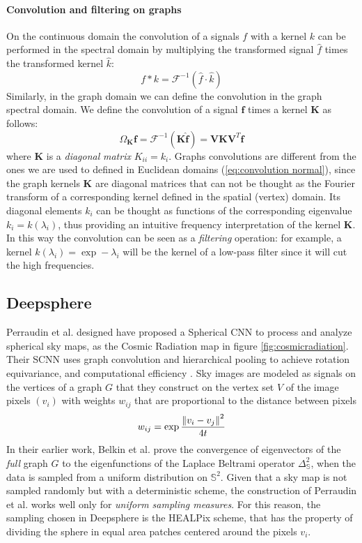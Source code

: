 \paragraph{Convolution and filtering on graphs}
On the continuous domain the convolution of a signals $f$ with a kernel $k$ can be performed in the spectral domain by multiplying the transformed signal $\hat f$ times the transformed kernel $\hat k$: 
\begin{equation}\label{eq:convolution normal}
	f*k = \mathcal F^{-1}(\hat f \cdot \hat k)
\end{equation}
Similarly, in the graph domain we can define the convolution in the graph spectral domain. We define the convolution of a signal $\mathbf f$ times a kernel $\mathbf K$ as follows:
\begin{equation}\label{eq:graph convolution}
	\Omega_\mathbf K\mathbf f = \mathcal{F}^{-1}(\mathbf K \hat {\mathbf f})= \mathbf V\mathbf K  \mathbf V^T {\mathbf f}
\end{equation}
where $\mathbf K$ is a \textit{diagonal} \textit{matrix} $K_{ii} = k_i$. Graphs convolutions are different from the ones we are used to defined in Euclidean domains (\ref{eq:convolution normal}), since the graph kernels $\mathbf K$ are diagonal matrices that can not be thought as the Fourier transform of a corresponding kernel defined in the spatial (vertex) domain. Its diagonal elements $k_{i}$ can be thought as functions of the corresponding eigenvalue $k_{i}= k(\lambda_i)$, thus providing an intuitive frequency interpretation of the kernel $\mathbf K$. In this way the convolution can be seen as a \textit{filtering} operation: for example, a kernel $k(\lambda_i) = \exp -\lambda_i$ will be the kernel of a low-pass filter since it will cut the high frequencies.

\subsection{Deepsphere}\label{sec:Chapter1:DeepSphere}
Perraudin et al. designed have proposed a Spherical CNN to process and analyze spherical sky maps, as the Cosmic Radiation map in figure \ref{fig:cosmicradiation}. Their SCNN uses graph convolution and hierarchical pooling to achieve rotation equivariance, and computational efficiency \cite{DeepSphere}. Sky images are modeled as signals on the vertices of a graph $G$ that they construct on the vertex set $V$ of the image pixels $(v_i)$ with weights $w_{ij}$ that are proportional to the distance between pixels 
$$
w_{ij}=\exp \frac{\left\lVert v_i-v_j\right\rVert^2}{4t}
$$
In their earlier work, Belkin et al. \cite{NIPS2006_2989} prove the convergence of eigenvectors of the \textit{full} graph $G$ to the eigenfunctions of the Laplace Beltrami operator $\Delta_\mathbb S^2$, when the data is sampled from a uniform distribution on $\mathbb S^2$. Given that a sky map is not sampled randomly but with a deterministic scheme, the construction of Perraudin et al. works well only for \textit{uniform sampling measures}. For this reason, the sampling chosen in Deepsphere is the HEALPix scheme, that has the property of dividing the sphere in equal area patches centered around the pixels $v_i$.

